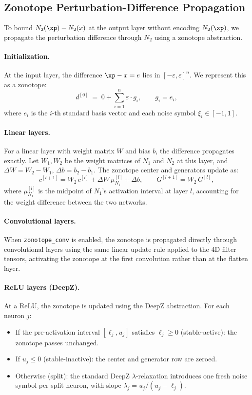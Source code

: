 \subsection{Zonotope Perturbation-Difference Propagation}
\label{sec:no_n2_xp:zonotope}

To bound $N_2(\xp) - N_2(x)$ at the output layer without encoding $N_2(\xp)$, we propagate the perturbation difference through $N_2$ using a zonotope abstraction.

\paragraph{Initialization.}
At the input layer, the difference $\xp - x = e$ lies in $[-\varepsilon, \varepsilon]^n$. We represent this as a zonotope:
\[
  d^{[0]} \;=\; 0 + \sum_{i=1}^{n} \varepsilon \cdot g_i, \qquad g_i = e_i,
\]
where $e_i$ is the $i$-th standard basis vector and each noise symbol $\xi_i \in [-1, 1]$.

\paragraph{Linear layers.}
For a linear layer with weight matrix $W$ and bias $b$, the difference propagates exactly. Let $W_1, W_2$ be the weight matrices of $N_1$ and $N_2$ at this layer, and $\Delta W = W_2 - W_1$, $\Delta b = b_2 - b_1$. The zonotope center and generators update as:
\[
  c^{[l+1]} = W_2\, c^{[l]} + \Delta W\, \mu^{[l]}_{N_1} + \Delta b, \qquad
  G^{[l+1]} = W_2\, G^{[l]},
\]
where $\mu^{[l]}_{N_1}$ is the midpoint of $N_1$'s activation interval at layer $l$, accounting for the weight difference between the two networks.

\paragraph{Convolutional layers.}
When \texttt{zonotope\_conv} is enabled, the zonotope is propagated directly through convolutional layers using the same linear update rule applied to the 4D filter tensors, activating the zonotope at the first convolution rather than at the flatten layer.

\paragraph{ReLU layers (DeepZ).}
At a ReLU, the zonotope is updated using the DeepZ abstraction. For each neuron $j$:
\begin{itemize}
  \item If the pre-activation interval $[\ell_j, u_j]$ satisfies $\ell_j \ge 0$ (stable-active): the zonotope passes unchanged.
  \item If $u_j \le 0$ (stable-inactive): the center and generator row are zeroed.
  \item Otherwise (split): the standard DeepZ $\lambda$-relaxation introduces one fresh noise symbol per split neuron, with slope $\lambda_j = u_j / (u_j - \ell_j)$.
\end{itemize}

